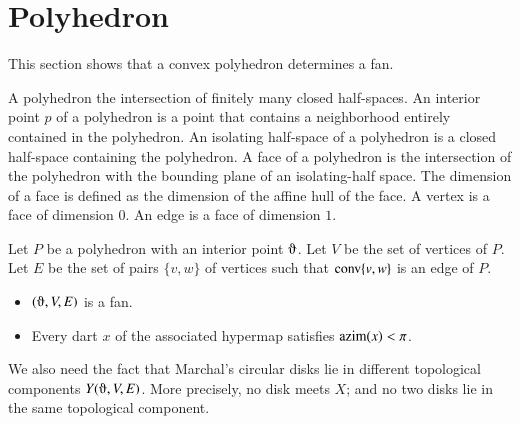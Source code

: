 \section{Polyhedron}

This section shows that a convex polyhedron determines a fan.

\begin{definition}
A polyhedron the intersection of finitely many closed half-spaces.
An interior point $p$ of a polyhedron is a point that contains a neighborhood
entirely contained in the polyhedron. An isolating half-space of
a polyhedron is a closed half-space containing the polyhedron.  A face of a polyhedron
is the intersection of the polyhedron with the bounding plane of an isolating-half space.   The dimension of a face is defined as the dimension of the affine hull of the face.  A vertex is a face of dimension $0$.  An edge is a face of dimension $1$.
\end{definition}

\begin{lemma}\label{lemma:polyhedron}  
Let $P$ be a polyhedron with an interior point $\orgn$.
Let $V$ be the set of vertices of $P$.  Let $E$ be the set of pairs $\{v,w\}$
of vertices such that ${\operatorname{conv}}\{v,w\}$ is an edge of $P$.
\begin{itemize}
\item $(\orgn,V,E)$ is a fan.
\item Every dart $x$ of the associated hypermap satisfies ${\operatorname{azim}}(x)<\pi$.
\end{itemize}
\end{lemma}


\begin{note}%
We also need the fact that Marchal's circular disks lie in different topological components $Y(\orgn,V,E)$.  More precisely, no disk meets $X$; and no two disks lie in the same topological component.
\end{note}


